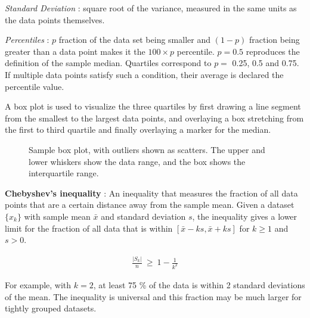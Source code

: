 \textit{Standard Deviation} : square root of the variance, measured in the same units as the data points themselves.

\textit{Percentiles} : $ p $ fraction of the data set being smaller and $ (1 - p) $ fraction being greater than a data point makes it the $ 100 \times p $ percentile. $ p = 0.5 $ reproduces the definition of the sample median. Quartiles correspond to $ p = $ 0.25, 0.5 and 0.75. If multiple data points satisfy such a condition, their average is declared the percentile value.

 A box plot is used to visualize the three quartiles by first drawing a line segment from the smallest to the largest data points, and overlaying a box stretching from the first to third quartile and finally overlaying a marker for the median.

\begin{figure}
	\centering
	\caption{Sample box plot, with outliers shown as scatters. The upper and lower whiskers show the data range, and the box shows the interquartile range.}
\end{figure}

\textbf{Chebyshev's inequality} : An inequality that measures the fraction of all data points that are a certain distance away from the sample mean. Given a dataset $ \{x_k\} $ with sample mean $ \bar{x} $ and standard deviation $ s $, the inequality gives a lower limit for the fraction of all data that is within $ [ \bar{x} - ks, \bar{x} + ks ] $ for $ k \geq 1$ and $ s > 0 $.

\begin{align}
	\frac{|S_{k}|}{n} \ \geq \ 1 - \frac{1}{k^{2}} 
\end{align}

For example, with $k = 2$, at least 75 \% of the data is within 2 standard deviations of the mean. The inequality is universal and this fraction may be much larger for tightly grouped datasets.

